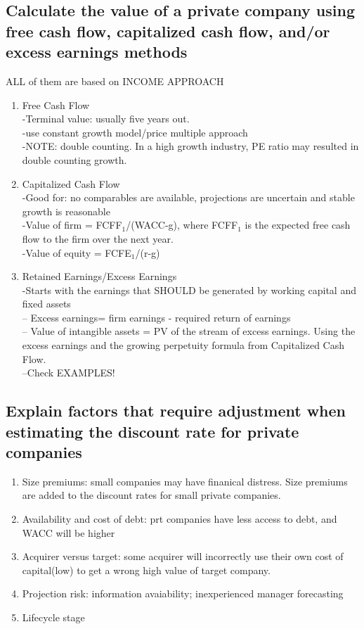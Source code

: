 \documentclass{article}
\newcommand{\be}{\begin{enumerate}}
\newcommand{\ee}{\end{enumerate}}
\begin{document}
\subsection{Calculate the value of a private company using free cash flow, 
capitalized cash flow, and/or excess earnings methods}
ALL of them are based on INCOME APPROACH
\be
    \item Free Cash Flow
        \\-Terminal value: usually five years out. 
        \\-use constant growth model/price multiple approach
        \\-NOTE: double counting. In a high growth industry, PE ratio may resulted in double
        counting growth.
    \item Capitalized Cash Flow
        \\-Good for: no comparables are available, projections are uncertain and stable
        growth is reasonable
        \\-Value of firm = FCFF$_1$/(WACC-g), where FCFF$_1$ is the expected free
        cash flow to the firm over the next year.
        \\-Value of equity = FCFE$_1$/(r-g)
    \item Retained Earnings/Excess Earnings
        \\-Starts with the earnings that SHOULD be generated by working capital and fixed assets
        \\-- Excess earnings= firm earnings - required return of earnings
        \\-- Value of intangible assets = PV of the stream of excess earnings. Using the excess earnings
        and the growing perpetuity formula from Capitalized Cash Flow.
        \\--Check EXAMPLES!
\ee
\subsection{Explain factors that require adjustment when estimating the discount rate
for private companies}
\be
    \item Size premiums: small companies may have finanical distress. Size premiums are added
        to the discount rates for small private companies.
    \item Availability and cost of debt: prt companies have less access to debt, and WACC will be higher
    \item Acquirer versus target: some acquirer will incorrectly use their own cost of capital(low) to 
        get a wrong high value of target company.
    \item Projection risk: information avaiability; inexperienced manager forecasting
    \item Lifecycle stage
\ee
\end{document}
